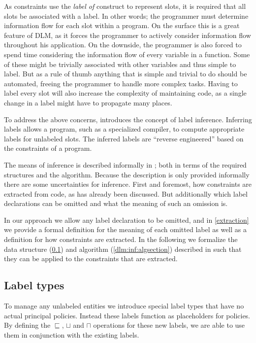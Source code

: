 As constraints use the \textit{label of} construct to represent slots, it is required that all slots be associated with a label.
In other words; the programmer must determine information flow for each slot within a program.
On the surface this is a great feature of DLM, as it forces the programmer to actively consider information flow throughout his application.
On the downside, the programmer is also forced to spend time considering the information flow of every variable in a function.
Some of these might be trivially associated with other variables and thus simple to label.
But as a rule of thumb anything that is simple and trivial to do should be automated, freeing the programmer to handle more complex tasks.
Having to label every slot will also increase the complexity of maintaining code, as a single change in a label might have to propagate many places.

To address the above concerns, \cite{myers1997} introduces the concept of label inference.
Inferring labels allows a program, such as a specialized compiler, to compute appropriate labels for unlabeled slots.
The inferred labels are ``reverse engineered'' based on the constraints of a program.

The means of inference is described informally in \cite{myers1997}; both in terms of the required structures and the algorithm.
Because the description is only provided informally there are some uncertainties for inference.
First and foremost, how constraints are extracted from code, as has already been discussed.
But additionally which label declarations can be omitted and what the meaning of such an omission is.

In our approach we allow any label declaration to be omitted, and in \cref{extraction} we provide a formal definition for the meaning of each omitted label as well as a definition for how constraints are extracted.
In the following we formalize the data structure (\cref{dlm:inf:types}) and algorithm (\cref{dlm:inf:algsection}) described in \cite{myers1997} such that they can be applied to the constraints that are extracted.

\subsection{Label types}\label{dlm:inf:types}
To manage any unlabeled entities we introduce special label types that have no actual principal policies.
Instead these labels function as placeholders for policies.
By defining the $\sqsubseteq$, $\sqcup$ and $\sqcap$ operations for these new labels, we are able to use them in conjunction with the existing labels.

